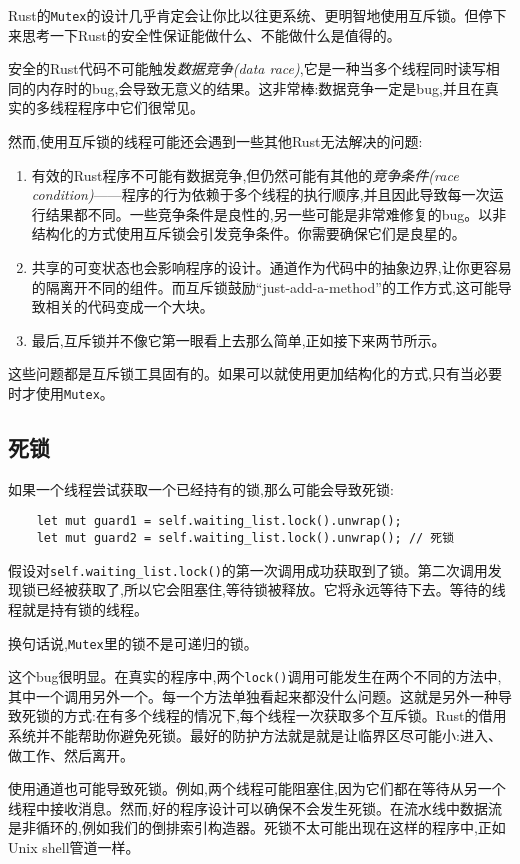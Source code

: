 Rust的\texttt{Mutex}的设计几乎肯定会让你比以往更系统、更明智地使用互斥锁。但停下来思考一下Rust的安全性保证能做什么、不能做什么是值得的。

安全的Rust代码不可能触发\emph{数据竞争(data race)},它是一种当多个线程同时读写相同的内存时的bug,会导致无意义的结果。这非常棒:数据竞争一定是bug,并且在真实的多线程程序中它们很常见。

然而,使用互斥锁的线程可能还会遇到一些其他Rust无法解决的问题:
\begin{enumerate}
    \item 有效的Rust程序不可能有数据竞争,但仍然可能有其他的\emph{竞争条件(race condition)}——程序的行为依赖于多个线程的执行顺序,并且因此导致每一次运行结果都不同。一些竞争条件是良性的,另一些可能是非常难修复的bug。以非结构化的方式使用互斥锁会引发竞争条件。你需要确保它们是良星的。
    \item 共享的可变状态也会影响程序的设计。通道作为代码中的抽象边界,让你更容易的隔离开不同的组件。而互斥锁鼓励“just-add-a-method”的工作方式,这可能导致相关的代码变成一个大块。
    \item 最后,互斥锁并不像它第一眼看上去那么简单,正如接下来两节所示。
\end{enumerate}

这些问题都是互斥锁工具固有的。如果可以就使用更加结构化的方式,只有当必要时才使用\texttt{Mutex}。

\subsection{死锁}
如果一个线程尝试获取一个已经持有的锁,那么可能会导致死锁:
\begin{verbatim}
    let mut guard1 = self.waiting_list.lock().unwrap();
    let mut guard2 = self.waiting_list.lock().unwrap(); // 死锁
\end{verbatim}

假设对\texttt{self.waiting\_list.lock()}的第一次调用成功获取到了锁。第二次调用发现锁已经被获取了,所以它会阻塞住,等待锁被释放。它将永远等待下去。等待的线程就是持有锁的线程。

换句话说,\texttt{Mutex}里的锁不是可递归的锁。

这个bug很明显。在真实的程序中,两个\texttt{lock()}调用可能发生在两个不同的方法中,其中一个调用另外一个。每一个方法单独看起来都没什么问题。这就是另外一种导致死锁的方式:在有多个线程的情况下,每个线程一次获取多个互斥锁。Rust的借用系统并不能帮助你避免死锁。最好的防护方法就是就是让临界区尽可能小:进入、做工作、然后离开。

使用通道也可能导致死锁。例如,两个线程可能阻塞住,因为它们都在等待从另一个线程中接收消息。然而,好的程序设计可以确保不会发生死锁。在流水线中数据流是非循环的,例如我们的倒排索引构造器。死锁不太可能出现在这样的程序中,正如Unix shell管道一样。

